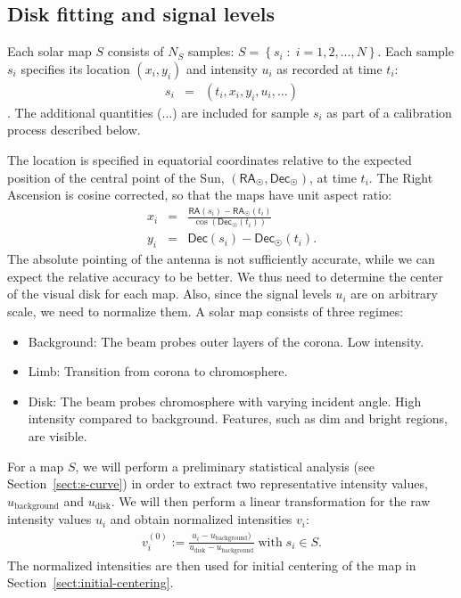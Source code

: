 \documentclass{aa}
\newcommand{\eqnl}[2]{\begin{eqnarray}\label{#1}#2\end{eqnarray}}
\newcommand{\s}[2]{{#1}_{\mathrm{#2}}}
\newcommand{\RA}{{\mathsf{RA}}}
\newcommand{\Dec}{{\mathsf{Dec}}}
\begin{document}


  \subsection{Disk fitting and signal levels} \label{sect:disk}

    

  Each solar map $S$ consists of $N_S$ samples: $S = \left\{ s_i \;:\; i = 1, 2, ..., N \right\}$. Each sample $s_i$ specifies its location $(x_i,y_i)$ and intensity $u_i$ as recorded at time $t_i$:
  \eqnl{radio_sample}{
  s_i &=& \left( t_i, x_i, y_i, u_i, ... \right)
  }.
  The additional quantities ($...$) are included for sample $s_i$ as part of a calibration process described below.
  
  The location is specified in equatorial coordinates relative to the expected position of the central point of the Sun, $(\RA_{\astrosun}, \Dec_{\astrosun})$, at time $t_i$. The Right Ascension is cosine corrected, so that the maps have unit aspect ratio:
  \eqnl{relative_radec}{
  x_i &=& \frac{\RA(s_i) - \RA_{\astrosun}(t_i)}{\cos \left( \Dec_{\astrosun}(t_i) \right)} \\
  y_i &=& \Dec(s_i) - \Dec_{\astrosun}(t_i)\text{.}
  }
  The absolute pointing of the antenna is not sufficiently accurate, while we can expect the relative accuracy to be 
  better. We thus need to determine the center of the visual disk for each map. Also, since the signal levels $u_i$ are on arbitrary scale, we 
  need to normalize them. A solar map consists of three regimes:
  \begin{itemize}
  \item Background: The beam probes outer layers of the corona. Low intensity.
  \item Limb: Transition from corona to chromosphere.
  \item Disk: The beam probes chromosphere with varying incident angle. High intensity compared to background. Features, such as dim and bright regions, are visible.
  \end{itemize}
  For a map $S$, we will perform a preliminary statistical analysis (see Section~\ref{sect:s-curve}) in order to extract 
  two representative intensity values, $\s{u}{background}$ and $\s{u}{disk}$. We will then perform a linear 
  transformation for the raw intensity values $u_i$ and obtain normalized intensities $v_i$:
  \eqnl{map_normalization}{
  v_i^{(0)} := \frac{u_i - \s{u}{background})}{\s{u}{disk} - \s{u}{background}} \; \text{with} \; s_i \in S \text{.}
  }
  The normalized intensities are then used for initial centering of the map in Section~\ref{sect:initial-centering}.
\end{document}
